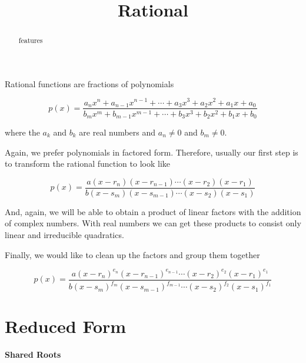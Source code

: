 \documentclass{ximera}
\title{Rational}
\begin{document}
\begin{abstract}
features
\end{abstract}
\maketitle










Rational functions are fractions of polynomials




\[ p(x) =   \frac{ a_n x^n + a_{n-1} x^{n-1} + \cdots + a_3 x^3 + a_2 x^2 + a_1 x + a_0  } { b_m x^m + b_{m-1} x^{m-1} + \cdots + b_3 x^3 + b_2 x^2 + b_1 x + b_0 }   \]



where the $a_k$ and $b_k$ are real numbers and $a_n \ne 0$ and $b_m \ne 0$.








Again, we prefer polynomials in factored form.  Therefore, usually our first step is to transform the rational function to look like



\[ p(x) =   \frac{ a (x-r_n)(x-r_{n-1})  \cdots (x-r_2)(x-r_1)  } { b (x-s_m)(x-s_{m-1})  \cdots (x-s_2)(x-s_1) }   \]




And, again, we will be able to obtain a product of linear factors with the addition of complex numbers.  With real numbers we can get these products to consist only linear and irreducible quadratics.




Finally, we would like to clean up the factors and group them together






\[ p(x) =   \frac{ a (x-r_n)^{e_n} (x-r_{n-1})^{e_{n-1}}  \cdots (x-r_2)^{e_2} (x-r_1)^{e_1}  } { b (x-s_m)^{f_m} (x-s_{m-1})^{f_{m-1}}  \cdots (x-s_2)^{f_2} (x-s_1)^{f_1} }   \]






\section{Reduced Form}

\textbf{Shared Roots}
\end{document}
